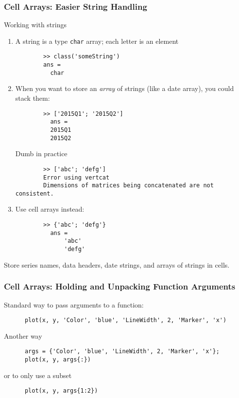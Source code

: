 \documentclass{beamer}
\begin{document}
  \begin{frame}[fragile,shrink=10]
    \frametitle{Cell Arrays: Easier String Handling}

    Working with strings
    \begin{enumerate}
      \item A string is a type \texttt{char} array; each letter is an element
      \begin{lstlisting}
        >> class('someString')
        ans =
          char
      \end{lstlisting}\pause

      \item When you want to store an \emph{array} of strings (like a
      date array), you could stack them:
      \begin{lstlisting}
        >> ['2015Q1'; '2015Q2']
          ans =
          2015Q1
          2015Q2
      \end{lstlisting}\pause
      Dumb in practice
      \begin{lstlisting}
        >> ['abc'; 'defg']
        Error using vertcat
        Dimensions of matrices being concatenated are not consistent.
      \end{lstlisting}\pause

      \item Use cell arrays instead:
      \begin{lstlisting}
        >> {'abc'; 'defg'}
          ans =
              'abc'
              'defg'
      \end{lstlisting}
    \end{enumerate}
    Store series names, data headers, date strings, and arrays of
    strings in cells.

	\end{frame}



  \begin{frame}[fragile]
    \frametitle{Cell Arrays: Holding and Unpacking Function Arguments}

    Standard way to pass arguments to a function:
    \begin{lstlisting}
      plot(x, y, 'Color', 'blue', 'LineWidth', 2, 'Marker', 'x')
    \end{lstlisting}\pause
    Another way
    \begin{lstlisting}
      args = {'Color', 'blue', 'LineWidth', 2, 'Marker', 'x'};
      plot(x, y, args{:})
    \end{lstlisting}
    or to only use a subset
    \begin{lstlisting}
      plot(x, y, args{1:2})
    \end{lstlisting}
	\end{frame}
\end{document}
